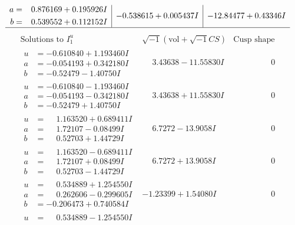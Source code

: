 \documentclass[1p]{elsarticle_modified}
\theoremstyle{definition}
\newcommand{\I}{\sqrt{-1}}
\begin{document}
$$\begin{array}{c|c|c}
\begin{aligned}
a &= \phantom{-}0.876169 + 0.195926 I \\
b &= \phantom{-}0.539552 + 0.112152 I\end{aligned}
 & -0.538615 + 0.005437 I & -12.84477 + 0.43346 I\\
 \hline 
 \end{array}$$\newpage$$\begin{array}{c|c|c}  
\text{Solutions to }I^u_{1}& \I (\text{vol} + \sqrt{-1}CS) & \text{Cusp shape}\\
 \hline 
\begin{aligned}
u &= -0.610840 + 1.193460 I \\
a &= -0.054193 + 0.342180 I \\
b &= -0.52479 - 1.40750 I\end{aligned}
 & \phantom{-}3.43638 - 11.55830 I & \phantom{-0.000000 } 0 \\ \hline\begin{aligned}
u &= -0.610840 - 1.193460 I \\
a &= -0.054193 - 0.342180 I \\
b &= -0.52479 + 1.40750 I\end{aligned}
 & \phantom{-}3.43638 + 11.55830 I & \phantom{-0.000000 } 0 \\ \hline\begin{aligned}
u &= \phantom{-}1.163520 + 0.689411 I \\
a &= \phantom{-}1.72107 - 0.08499 I \\
b &= \phantom{-}0.52703 + 1.44729 I\end{aligned}
 & \phantom{-}6.7272 - 13.9058 I & \phantom{-0.000000 } 0 \\ \hline\begin{aligned}
u &= \phantom{-}1.163520 - 0.689411 I \\
a &= \phantom{-}1.72107 + 0.08499 I \\
b &= \phantom{-}0.52703 - 1.44729 I\end{aligned}
 & \phantom{-}6.7272 + 13.9058 I & \phantom{-0.000000 } 0 \\ \hline\begin{aligned}
u &= \phantom{-}0.534889 + 1.254550 I \\
a &= \phantom{-}0.262606 - 0.299605 I \\
b &= -0.206473 + 0.740584 I\end{aligned}
 & -1.23399 + 1.54080 I & \phantom{-0.000000 } 0 \\ \hline\begin{aligned}
u &= \phantom{-}0.534889 - 1.254550 I \\

\end{aligned}
\end{array}$$
\end{document}
